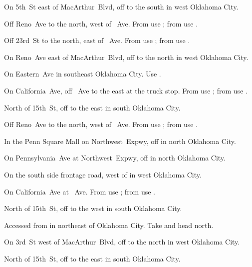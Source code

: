 
\begin{LocationList}

On 5th~St east of MacArthur~Blvd, off   to the south in west Oklahoma City.

Off Reno~Ave to the north, west of \MLKing~Ave.
From  use ; from  use .
	
Off 23rd~St to the north, east of \MLKing~Ave.
From  use ; from  use .

On Reno~Ave east of MacArthur~Blvd, off   to the north in west Oklahoma City.

\Location{\GarageHQ \Garage}
On Eastern~Ave in southeast Oklahoma City.
Use  .

On California~Ave, off \MLKing~Ave to the east at the truck stop.
From  use ; from  use .

North of 15th~St, off   to the east in south Oklahoma City.

Off Reno~Ave to the north, west of \MLKing~Ave.
From  use ; from  use .

In the Penn Square Mall on Northwest~Expwy, off  in north Oklahoma City.

On Pennsylvania~Ave at Northwest~Expwy, off  in north Oklahoma City.

On the south side  frontage road, west of  in west Oklahoma City.

\Location{\TruckStop \Gas \Rest \Service \Weigh}
On California~Ave at \MLKing~Ave.
From  use ; from  use .

North of 15th~St, off   to the west in south Oklahoma City.

Accessed from  in  northeast of Oklahoma City.
Take   and head north.

On 3rd~St west of MacArthur~Blvd, off   to the north in west Oklahoma City.

North of 15th~St, off   to the east in south Oklahoma City.

\end{LocationList}
